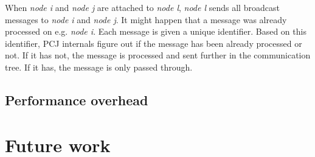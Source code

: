 \documentclass{llncs}
\begin{document}
When \emph{node i} and \emph{node j} are attached to \emph{node l}, \emph{node l} sends all broadcast messages to \emph{node i} and \emph{node j}.
It might happen that a message was already processed on e.g. \emph{node i}.
Each message is given a unique identifier. Based on this identifier, PCJ internals figure out if the message has been already processed or not.
If it has not, the message is processed and sent further in the communication tree. If it has, the message is only passed through.

\subsection{Performance overhead}

\section{Future work}

\end{document}

